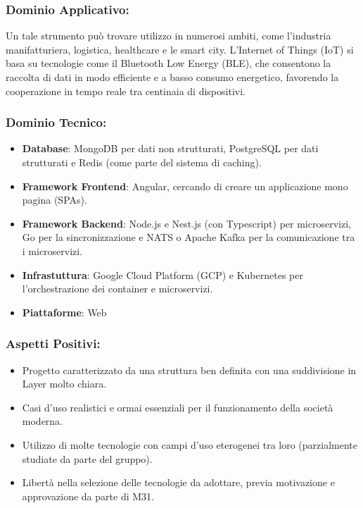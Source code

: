 \documentclass[a4paper,12pt]{article}
\begin{document}
\subsubsection*{Dominio Applicativo:} 
Un tale strumento può trovare utilizzo in numerosi ambiti, come l'industria manifatturiera, logistica, healthcare e le smart city. L’Internet of Things (IoT) si basa su tecnologie come il Bluetooth Low Energy (BLE), che consentono la raccolta di dati in modo efficiente e a basso consumo energetico, favorendo la cooperazione in tempo reale tra centinaia di dispositivi.
\subsubsection*{Dominio Tecnico:}
\begin{itemize}
    \item \textbf{Database}: MongoDB per dati non strutturati, PostgreSQL per dati strutturati e Redis (come parte del sistema di caching).
    \item \textbf{Framework Frontend}: Angular, cercando di creare un applicazione mono pagina (SPAs).
    \item \textbf{Framework Backend}: Node.js e Nest.js (con Typescript) per microservizi, Go per la sincronizzazione e NATS o Apache Kafka per la comunicazione tra i microservizi.
    \item \textbf{Infrastuttura}: Google Cloud Platform (GCP) e Kubernetes per l'orchestrazione dei container e microservizi.
    \item \textbf{Piattaforme}: Web
\end{itemize}
\subsubsection*{Aspetti Positivi:}
\begin{itemize}
    \item Progetto caratterizzato da una struttura ben definita con una suddivisione in Layer molto chiara.
    \item Casi d’uso realistici e ormai essenziali per il funzionamento della società moderna.
    \item Utilizzo di molte tecnologie con campi d'uso eterogenei tra loro (parzialmente studiate da parte del gruppo).
    \item Libertà nella selezione delle tecnologie da adottare, previa motivazione e approvazione da parte di M31.
\end{itemize}
\end{document}

